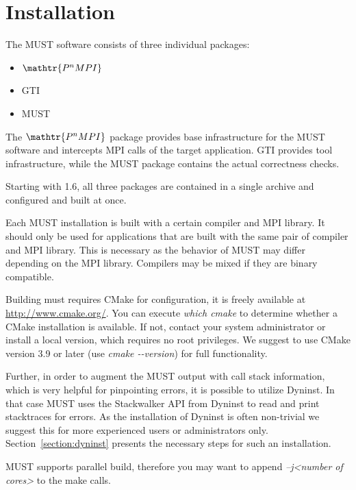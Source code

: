 \documentclass[english]{scrartcl}
\newcommand{\pnmpi}{$\mathop{\mathtr{P^nMPI}}\nolimits$\xspace}
\begin{document}
\section{Installation}

The MUST software consists of three individual packages:
\begin{itemize}
  \item \pnmpi
  \item GTI
  \item MUST
\end{itemize}

The \pnmpi package provides base infrastructure for the MUST software and
intercepts MPI calls of the target application. GTI provides tool
infrastructure, while the MUST package contains the actual correctness checks.

Starting with 1.6, all three packages are contained in a single archive and
configured and built at once.

Each MUST installation is built with a certain compiler and MPI library. It
should only be used for applications that are built with the same pair of
compiler and MPI library. This is necessary as the behavior of MUST may differ
depending on the MPI library. Compilers may be mixed if they are binary
compatible.

Building must requires CMake for configuration, it is freely available at
\url{http://www.cmake.org/}. You can execute \emph{which cmake} to determine
whether a CMake installation is available. If not, contact your system
administrator or install a local version, which requires no root
privileges. We suggest to use CMake version 3.9 or later 
(use \emph{cmake \mbox{-{}-}version}) for full functionality.

Further, in order to augment the MUST output with call stack information, which
is very helpful for pinpointing errors, it is possible to utilize Dyninst. In
that case MUST uses the Stackwalker API from Dyninst to read and print
stacktraces for errors. As the installation of Dyninst is often non-trivial we
suggest this for more experienced users or administrators only.
Section~\ref{section:dyninst} presents the necessary steps for such an
installation.

MUST supports parallel build, therefore you may want
to append \emph{\mbox{--}j\textless number of cores\textgreater} to the make
calls.
\end{document}
